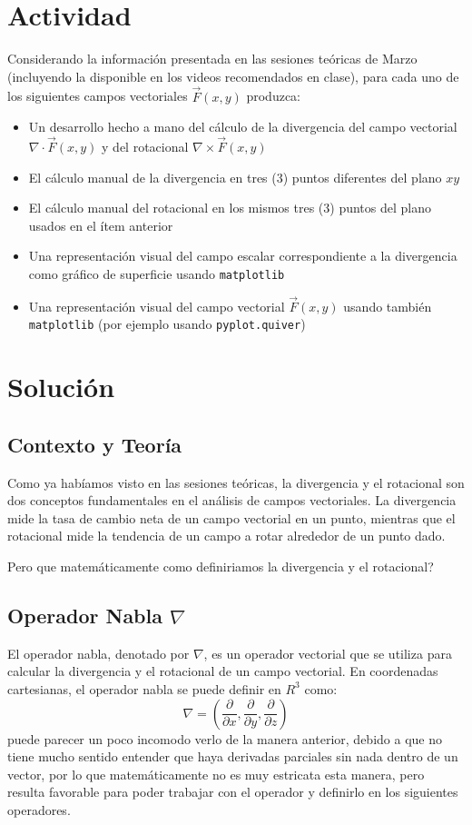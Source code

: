 \section*{Actividad}

Considerando la información presentada en las sesiones teóricas de Marzo (incluyendo la disponible en los videos 
recomendados en clase), para cada uno de los siguientes campos vectoriales $ \vec{F}(x,y) $ produzca:

\begin{itemize}
    \item Un desarrollo hecho a mano del cálculo de la divergencia del campo vectorial $ \nabla \cdot \vec{F}(x,y) $ 
    y del rotacional $ \nabla \times \vec{F}(x,y)$
    \item El cálculo manual de la divergencia en tres (3) puntos diferentes del plano $xy$
    \item El cálculo manual del rotacional en los mismos tres (3) puntos del plano usados en el ítem anterior
    \item Una representación visual del campo escalar correspondiente a la divergencia como gráfico de superficie 
    usando \texttt{matplotlib}
    \item Una representación visual del campo vectorial $ \vec{F}(x,y) $ usando también \texttt{matplotlib} 
    (por ejemplo usando \texttt{pyplot.quiver})
\end{itemize}
    

\section*{Solución}

\subsection{Contexto y Teoría}

Como ya habíamos visto en las sesiones teóricas, la divergencia y el rotacional son dos conceptos 
fundamentales en el análisis de campos vectoriales. La divergencia mide la tasa de cambio neta de un campo vectorial en 
un punto, mientras que el rotacional mide la tendencia de un campo a rotar alrededor de un punto dado.

Pero que matemáticamente como definiriamos la divergencia y el rotacional?

\subsection{Operador Nabla $\nabla$}
El operador nabla, denotado por $\nabla$, es un operador vectorial que se utiliza para calcular la divergencia y el 
rotacional de un campo vectorial. En coordenadas cartesianas, el operador nabla se puede definir en $R^3$ como:
$$
\nabla = \left( \frac{\partial}{\partial x}, \frac{\partial}{\partial y}, \frac{\partial}{\partial z} \right)
$$
puede parecer un poco incomodo verlo de la manera anterior, debido a que no tiene mucho sentido entender que haya 
derivadas parciales sin nada dentro de un vector, por lo que matemáticamente no es muy estricata esta manera, pero 
resulta favorable para poder trabajar con el operador y definirlo en los siguientes operadores.

